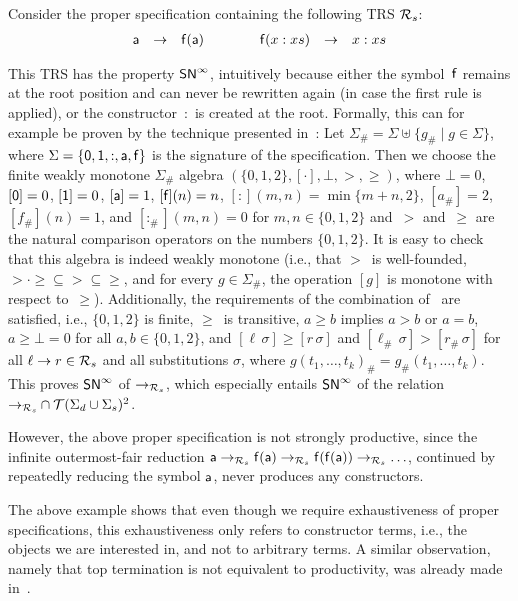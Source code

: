 \documentclass{eptcs}
\begin{document}
\begin{example}
\label{ex:CexpSNinf}
Consider the proper specification containing the following TRS $\mathcal{R}_s$:
\[
\begin{array}{rcl@{\qquad\qquad}rcl}
\fsym{a} &\to& \fsym{f}(\fsym{a})
&
\fsym{f}(x : xs) &\to& x : xs
\end{array}
\]

This TRS has the property $\mathsf{SN}^{\infty}$, intuitively because either the
symbol~$\mathsf{f}$ remains at the root position and can never be rewritten again
(in case the first rule is applied), or the constructor~$:$ is created at the
root. Formally, this can for example be proven by the technique presented
in~\cite{Z08}: Let $\Sigma_{\#} = \Sigma \uplus \{ g_{\#} \mid g \in \Sigma\}$,
where $\Sigma = \{ \mathsf{0}, \mathsf{1}, {:}, \mathsf{a}, \mathsf{f} \}$ is the signature of
the specification.
Then we choose the finite weakly monotone $\Sigma_{\#}$ algebra
$(\{0,1,2\}, [\cdot], \bot, >, \ge)$, where $\bot = 0$, $[\mathsf{0}] = 0$,
$[\mathsf{1}] = 0$,
$[\mathsf{a}] = 1$, $[\mathsf{f}](n) = n$, $[:](m,n) = \min \{m+n, 2\}$,
$[a_{\#}] = 2$, $[f_{\#}](n) = 1$, and $[:_{\#}](m,n) = 0$ for
$m,n \in \{0,1,2\}$ and~$>$ and~$\ge$ are the natural comparison operators on
the numbers $\{0,1,2\}$.
It is easy to check that this algebra is indeed weakly monotone (i.e., that
$>$~is well-founded, ${>} \cdot {\ge} \subseteq {>} \subseteq {\ge}$, and
for every $g \in \Sigma_{\#}$, the operation $[g]$ is monotone with respect
to~$\ge$). Additionally, the requirements of the combination
of~\cite[Theorem~5 and Theorem~6]{Z08} are satisfied, i.e., $\{0,1,2\}$ is
finite, $\ge$~is transitive, $a \ge b$ implies $a > b$ or $a = b$,
$a \ge \bot = 0$ for all $a,b \in \{0,1,2\}$, and
$[\ell\,\sigma] \ge [r\,\sigma]$ and $[\ell_{\#}\,\sigma] > [r_{\#}\,\sigma]$
for all $\ell \to r \in \mathcal{R}_s$ and all substitutions $\sigma$, where
$g(t_1, \dotsc, t_k)_{\#} = g_{\#}(t_1, \dotsc, t_k)$.
This proves $\mathsf{SN}^{\infty}$ of $\to_{\mathcal{R}_s}$, which especially entails $\mathsf{SN}^{\infty}$ of the
relation ${\to_{\mathcal{R}_s}} \cap \mathcal{T}(\Sigma_d \cup \Sigma_s)^2$.

However, the above proper specification is not strongly productive, since the
infinite outermost-fair reduction
$\mathsf{a} \to_{\mathcal{R}_s} \mathsf{f}(\mathsf{a}) \to_{\mathcal{R}_s} \mathsf{f}(\mathsf{f}(\mathsf{a}))
\to_{\mathcal{R}_s} \ldots$,
continued by repeatedly reducing the symbol $\mathsf{a}$,
never produces any constructors.
\end{example}

The above example shows that even though we require exhaustiveness of proper
specifications, this exhaustiveness only refers to constructor terms, i.e., the
objects we are interested in, and not to arbitrary terms. A similar observation,
namely that top termination is not equivalent to productivity, was already made
in~\cite{ZR09}.
\end{document}
